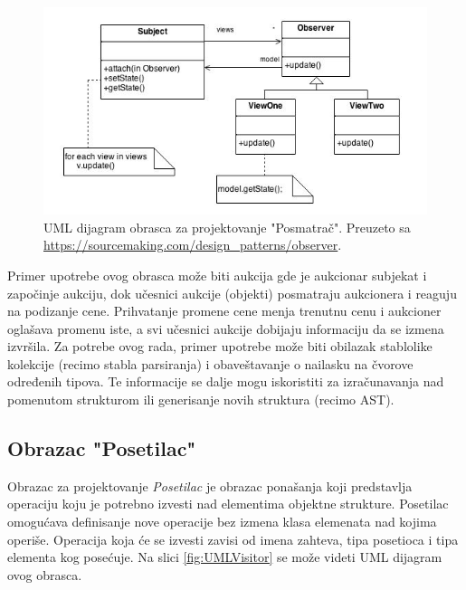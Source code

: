 \begin{figure}[h!]
\centering
\includegraphics[scale=0.8]{images/observer.jpg}
\caption{UML dijagram obrasca za projektovanje "Posmatrač". Preuzeto sa \url{https://sourcemaking.com/design_patterns/observer}.} 
\label{fig:UMLObserver}
\end{figure}

Primer upotrebe ovog obrasca može biti aukcija gde je aukcionar subjekat i započinje aukciju, dok učesnici aukcije (objekti) posmatraju aukcionera i reaguju na podizanje cene. Prihvatanje promene cene menja trenutnu cenu i aukcioner oglašava promenu iste, a svi učesnici aukcije dobijaju informaciju da se izmena izvršila. Za potrebe ovog rada, primer upotrebe može biti obilazak stablolike kolekcije (recimo stabla parsiranja) i obaveštavanje o nailasku na čvorove određenih tipova. Te informacije se dalje mogu iskoristiti za izračunavanja nad pomenutom strukturom ili generisanje novih struktura (recimo AST). 

\subsection{Obrazac "Posetilac"}
\label{subsec:DesignPatternsListener}

Obrazac za projektovanje \emph{Posetilac} je obrazac ponašanja koji predstavlja operaciju koju je potrebno izvesti nad elementima objektne strukture. Posetilac omogućava definisanje nove operacije bez izmena klasa elemenata nad kojima operiše. Operacija koja će se izvesti zavisi od imena zahteva, tipa posetioca i tipa elementa kog posećuje. Na slici \ref{fig:UMLVisitor} se može videti UML dijagram \cite{UML} ovog obrasca. 

